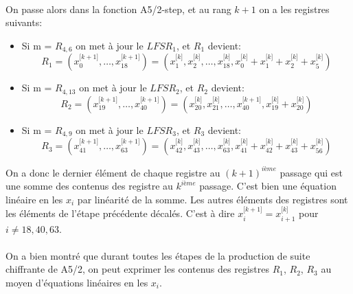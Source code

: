 \paragraph{}
On passe alors dans la fonction A5/2-step, et au rang $k+1$ on a les registres suivants:
\begin{itemize}
\item Si m = $R_{4,6}$ on met à jour le $LFSR_1$, et $R_1$ devient:
$$R_1 = (x^{\lbrack k+1\rbrack}_0, \ldots, x^{\lbrack k+1 \rbrack}_{18}) = (x^{\lbrack k\rbrack}_1, x^{\lbrack k\rbrack}_2, \ldots, x^{\lbrack k \rbrack}_{18}, x^{\lbrack k\rbrack}_0 + x^{\lbrack k\rbrack}_1 + x^{\lbrack k\rbrack}_2 + x^{\lbrack k\rbrack}_5)$$
\item Si m = $R_{4,13}$ on met à jour le $LFSR_2$, et $R_2$ devient:
$$R_2 = (x^{\lbrack k+1\rbrack}_{19}, \ldots, x^{\lbrack k+1 \rbrack}_{40}) = (x^{\lbrack k\rbrack}_{20},x^{\lbrack k\rbrack}_{21}, \ldots, x^{\lbrack k+1 \rbrack}_{40}, x^{\lbrack k\rbrack}_{19} + x^{\lbrack k\rbrack}_{20})$$
\item Si m = $R_{4,9}$ on met à jour le $LFSR_3$, et $R_3$ devient:
$$R_3 = (x^{\lbrack k+1\rbrack}_{41}, \ldots, x^{\lbrack k+1 \rbrack}_{63}) = (x^{\lbrack k\rbrack}_{42}, x^{\lbrack k\rbrack}_{43}, \ldots, x^{\lbrack k\rbrack}_{63},x^{\lbrack k\rbrack}_{41} + x^{\lbrack k\rbrack}_{42}+ x^{\lbrack k\rbrack}_{43}+ x^{\lbrack k\rbrack}_{56})$$
\end{itemize}

On a donc le dernier élément de chaque registre au $(k+1)^{ième}$ passage qui est une somme des contenus des registre au $k^{ième}$ passage.
C'est bien une équation linéaire en les $x_i$ par linéarité de la somme.
Les autres éléments des registres sont les éléments de l'étape précédente décalés. C'est à dire $x^{\lbrack k+1\rbrack}_{i} = x^{\lbrack k\rbrack}_{i+1}$ pour $ i \neq 18, 40, 63$.
\paragraph{}
On a bien montré que durant toutes les étapes de la production de suite chiffrante de A5/2, on peut exprimer les contenus des registres $R_1$, $R_2$, $R_3$ au moyen d'équations linéaires en les $x_i$. 
